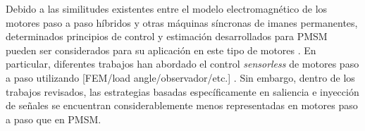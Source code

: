%
%
%
%

Debido a las similitudes existentes entre el modelo electromagnético de los motores paso a paso híbridos y otras máquinas síncronas de imanes permanentes, determinados principios de control y estimación desarrollados para PMSM pueden ser considerados para su aplicación en este tipo de motores \cite{lydellSensorlessHybridFieldOriented,picatosteruilopeModellingControlStepper2014}. En particular, diferentes trabajos han abordado el control \textit{sensorless} de motores paso a paso utilizando [FEM/load angle/observador/etc.] \cite{lydellSensorlessHybridFieldOriented}  \cite{derammelaereSensorlessLoadAngle2017} \cite{picatosteruilopeModellingControlStepper2014}. Sin embargo, dentro de los trabajos revisados, las estrategias basadas específicamente en saliencia e inyección de señales se encuentran considerablemente menos representadas en motores paso a paso que en PMSM.
%
%
%
%
%
%
%
%
%
%
%

